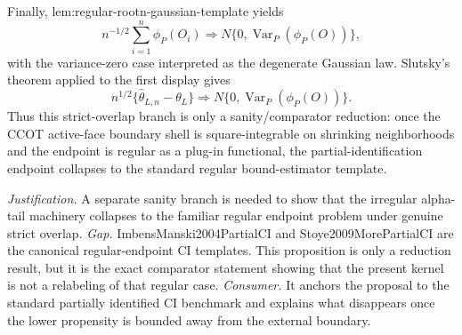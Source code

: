 \documentclass{article}
\begin{document}
Finally, lem:regular-rootn-gaussian-template yields
\[
 n^{-1/2}\sum_{i=1}^n\phi_P(O_i) \Rightarrow N\{0,\operatorname{Var}_P(\phi_P(O))\},
\]
with the variance-zero case interpreted as the degenerate Gaussian law. Slutsky's theorem applied to the first display gives
\[
 n^{1/2}\{\hat\theta_{L,n}-\theta_L\}\Rightarrow N\{0,\operatorname{Var}_P(\phi_P(O))\}.
\]
Thus this strict-overlap branch is only a sanity/comparator reduction: once the CCOT active-face boundary shell is square-integrable on shrinking neighborhoods and the endpoint is regular as a plug-in functional, the partial-identification endpoint collapses to the standard regular bound-estimator template.
\par\smallskip\noindent \textit{Justification.} A separate sanity branch is needed to show that the irregular alpha-tail machinery collapses to the familiar regular endpoint problem under genuine strict overlap. \textit{Gap.} ImbensManski2004PartialCI and Stoye2009MorePartialCI are the canonical regular-endpoint CI templates. This proposition is only a reduction result, but it is the exact comparator statement showing that the present kernel is not a relabeling of that regular case. \textit{Consumer.} It anchors the proposal to the standard partially identified CI benchmark and explains what disappears once the lower propensity is bounded away from the external boundary.
\end{document}
